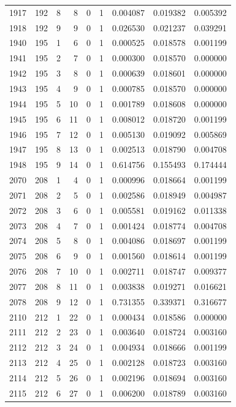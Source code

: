 \begin{longtable}{rrrrrrrrr}
1917 & 192 & 8 & 8 & 0 & 1 & 0.004087 & 0.019382 & 0.005392 \\
1918 & 192 & 9 & 9 & 0 & 1 & 0.026530 & 0.021237 & 0.039291 \\
1940 & 195 & 1 & 6 & 0 & 1 & 0.000525 & 0.018578 & 0.001199 \\
1941 & 195 & 2 & 7 & 0 & 1 & 0.000300 & 0.018570 & 0.000000 \\
1942 & 195 & 3 & 8 & 0 & 1 & 0.000639 & 0.018601 & 0.000000 \\
1943 & 195 & 4 & 9 & 0 & 1 & 0.000785 & 0.018570 & 0.000000 \\
1944 & 195 & 5 & 10 & 0 & 1 & 0.001789 & 0.018608 & 0.000000 \\
1945 & 195 & 6 & 11 & 0 & 1 & 0.008012 & 0.018720 & 0.001199 \\
1946 & 195 & 7 & 12 & 0 & 1 & 0.005130 & 0.019092 & 0.005869 \\
1947 & 195 & 8 & 13 & 0 & 1 & 0.002513 & 0.018790 & 0.004708 \\
1948 & 195 & 9 & 14 & 0 & 1 & 0.614756 & 0.155493 & 0.174444 \\
2070 & 208 & 1 & 4 & 0 & 1 & 0.000996 & 0.018664 & 0.001199 \\
2071 & 208 & 2 & 5 & 0 & 1 & 0.002586 & 0.018949 & 0.004987 \\
2072 & 208 & 3 & 6 & 0 & 1 & 0.005581 & 0.019162 & 0.011338 \\
2073 & 208 & 4 & 7 & 0 & 1 & 0.001424 & 0.018774 & 0.004708 \\
2074 & 208 & 5 & 8 & 0 & 1 & 0.004086 & 0.018697 & 0.001199 \\
2075 & 208 & 6 & 9 & 0 & 1 & 0.001560 & 0.018614 & 0.001199 \\
2076 & 208 & 7 & 10 & 0 & 1 & 0.002711 & 0.018747 & 0.009377 \\
2077 & 208 & 8 & 11 & 0 & 1 & 0.003838 & 0.019271 & 0.016621 \\
2078 & 208 & 9 & 12 & 0 & 1 & 0.731355 & 0.339371 & 0.316677 \\
2110 & 212 & 1 & 22 & 0 & 1 & 0.000434 & 0.018586 & 0.000000 \\
2111 & 212 & 2 & 23 & 0 & 1 & 0.003640 & 0.018724 & 0.003160 \\
2112 & 212 & 3 & 24 & 0 & 1 & 0.004934 & 0.018666 & 0.001199 \\
2113 & 212 & 4 & 25 & 0 & 1 & 0.002128 & 0.018723 & 0.003160 \\
2114 & 212 & 5 & 26 & 0 & 1 & 0.002196 & 0.018694 & 0.003160 \\
2115 & 212 & 6 & 27 & 0 & 1 & 0.006200 & 0.018789 & 0.003160 \\

\end{longtable}
